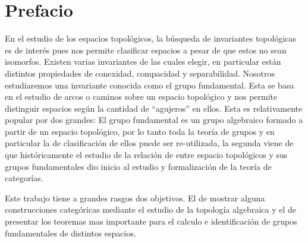 \section{Prefacio}
En el estudio de los espacios topológicos, la búsqueda de invariantes
topológicas es de interés pues nos permite clasificar espacios a pesar
de que estos no sean isomorfos. Existen varias invariantes de las cuales
elegir, en particular están distintos propiedades de conexidad,
compacidad y separabilidad. Nosotros estudiaremos una invariante
conocida como el grupo fundamental. Esta se basa en el estudio de arcos
o caminos sobre un espacio topológico y nos permite distinguir espacios
según la cantidad de ``agujeros'' en ellos. Esta es relativamente
popular por dos grandes: El grupo fundamental es un grupo algebraico
formado a partir de un espacio topológico, por lo tanto toda la teoría
de grupos y en particular la de clasificación de ellos puede ser
re-utilizada, la segunda viene de que históricamente el estudio de la
relación de entre espacio topológicos y sus grupos fundamentales dio
inicio al estudio y formalización de la teoría de categorías.

Este trabajo tiene a grandes rasgos dos objetivos. El de mostrar alguna
construcciones categóricas mediante el estudio de la topología
algebraica y el de presentar los teoremas mas importante para el calculo
e identificación de grupos fundamentales de distintos espacios.
